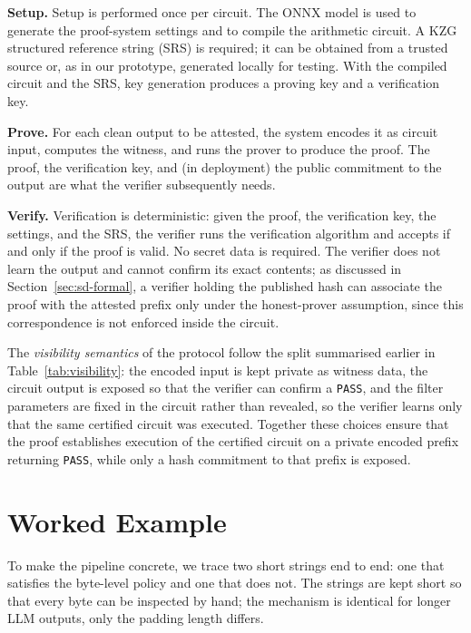 \medskip

\textbf{Setup.} Setup is performed once per circuit. The ONNX model is used to generate the proof-system settings and to compile the arithmetic circuit. A KZG structured reference string (SRS) is required; it can be obtained from a trusted source or, as in our prototype, generated locally for testing. With the compiled circuit and the SRS, key generation produces a proving key and a verification key.

\medskip

\textbf{Prove.} For each clean output to be attested, the system encodes it as circuit input, computes the witness, and runs the prover to produce the proof. The proof, the verification key, and (in deployment) the public commitment to the output are what the verifier subsequently needs.

\medskip

\textbf{Verify.} Verification is deterministic: given the proof, the verification key, the settings, and the SRS, the verifier runs the verification algorithm and accepts if and only if the proof is valid. No secret data is required. The verifier does not learn the output and cannot confirm its exact contents; as discussed in Section~\ref{sec:sd-formal}, a verifier holding the published hash can associate the proof with the attested prefix only under the honest-prover assumption, since this correspondence is not enforced inside the circuit.

\medskip

The \emph{visibility semantics} of the protocol follow the split summarised earlier in Table~\ref{tab:visibility}: the encoded input is kept private as witness data, the circuit output is exposed so that the verifier can confirm a \texttt{PASS}, and the filter parameters are fixed in the circuit rather than revealed, so the verifier learns only that the same certified circuit was executed. Together these choices ensure that the proof establishes execution of the certified circuit on a private encoded prefix returning \texttt{PASS}, while only a hash commitment to that prefix is exposed.

\section{Worked Example}
\label{sec:sd-example}

To make the pipeline concrete, we trace two short strings end to end: one that satisfies the byte-level policy and one that does not. The strings are kept short so that every byte can be inspected by hand; the mechanism is identical for longer LLM outputs, only the padding length differs.

